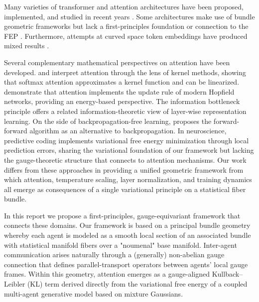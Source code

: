 \documentclass[twoside,11pt]{article}
\begin{document}
Many varieties of transformer and attention architectures have been proposed, implemented, and studied in recent years \citep{fuchs2020se3,thomas2018tensor}. Some architectures make use of bundle geometric frameworks but lack a first-principles foundation or connection to the FEP \citep{kondor2018generalization,finzi2020generalizing,bronstein2021geometric}. Furthermore, attempts at curved space token embeddings have produced mixed results \citep{bonnabel2013stochastic,absil2008optimization}.

Several complementary mathematical perspectives on attention have been developed. \citet{tsai2019transformer} and \citet{katharopoulos2020transformers} interpret attention through the lens of kernel methods, showing that softmax attention approximates a kernel function and can be linearized. \citet{ramsauer2021hopfield} demonstrate that attention implements the update rule of modern Hopfield networks, providing an energy-based perspective. The information bottleneck principle \citep{tishby2015deep,shwartz2017opening} offers a related information-theoretic view of layer-wise representation learning. On the side of backpropagation-free learning, \citet{hinton2022forward} proposes the forward-forward algorithm as an alternative to backpropagation. In neuroscience, predictive coding \citep{rao1999predictive,bogacz2017tutorial,millidge2021predictive} implements variational free energy minimization through local prediction errors, sharing the variational foundation of our framework but lacking the gauge-theoretic structure that connects to attention mechanisms. Our work differs from these approaches in providing a unified geometric framework from which attention, temperature scaling, layer normalization, and training dynamics all emerge as consequences of a single variational principle on a statistical fiber bundle.

In this report we propose a first-principles, gauge-equivariant framework that connects these domains. Our framework is based on a principal bundle geometry whereby each agent is modeled as a smooth local section of an associated bundle with statistical manifold fibers over a "noumenal" base manifold. Inter-agent communication arises naturally through a (generally) non-abelian gauge connection that defines parallel-transport operators between agents' local gauge frames. Within this geometry, attention emerges as a gauge-aligned Kullback–Leibler (KL) term derived directly from the variational free energy of a coupled multi-agent generative model based on mixture Gaussians.
\end{document}
